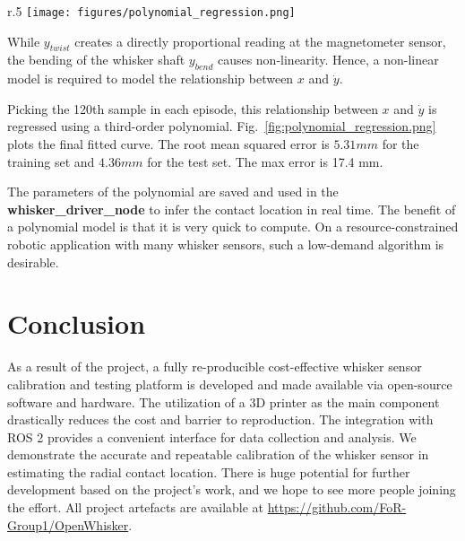 \documentclass[runningheads]{llncs}
\begin{document}
\begin{wrapfigure}{r}{.5\textwidth}
    \centering
    \texttt{[image: figures/polynomial\_regression.png]}
    \caption{Polynomial Regression of the relationship 100th sample of \(\dot{y}\) in each episode and the contact distance \(x\)}
    \label{fig:polynomial_regression.png}
\end{wrapfigure}

While \(y_{twist}\) creates a directly proportional reading at the magnetometer sensor, the bending of the whisker shaft \(y_{bend}\) causes non-linearity. Hence, a non-linear model is required to model the relationship between \(x\) and \(\dot{y}\).

Picking the 120th sample in each episode, this relationship between \(x\) and \(\dot{y}\) is regressed using a third-order polynomial. Fig.~\ref*{fig:polynomial_regression.png} plots the final fitted curve. The root mean squared error is $5.31 mm$ for the training set and $4.36 mm$ for the test set. The max error is 17.4 mm.

The parameters of the polynomial are saved and used in the \textbf{whisker\_driver\_node} to infer the contact location in real time. The benefit of a polynomial model is that it is very quick to compute. On a resource-constrained robotic application with many whisker sensors, such a low-demand algorithm is desirable.

\section{Conclusion}

As a result of the project, a fully re-producible cost-effective whisker sensor calibration and testing platform is developed and made available via open-source software and hardware. The utilization of a 3D printer as the main component drastically reduces the cost and barrier to reproduction. The integration with ROS 2 provides a convenient interface for data collection and analysis. We demonstrate the accurate and repeatable calibration of the whisker sensor in estimating the radial contact location. There is huge potential for further development based on the project's work, and we hope to see more people joining the effort. All project artefacts are available at \url{https://github.com/FoR-Group1/OpenWhisker}.


\end{document}
